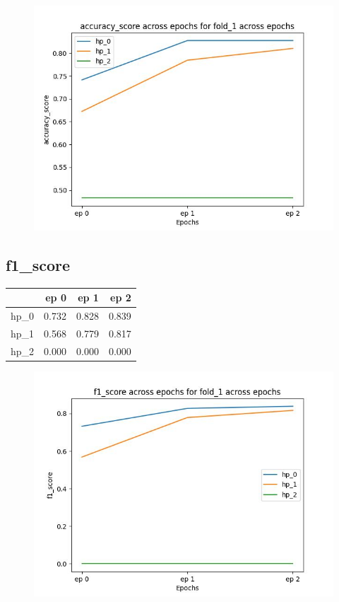 \documentclass{article}
\begin{document}
\begin{figure}[H]
\includegraphics[scale = 0.75]{fold_1/accuracy_score}
\end{figure}
\subsection{f1\_score}
\begin{tabular}{lrrr}
\toprule
{} &   ep 0 &   ep 1 &   ep 2 \\
\midrule
hp\_0 &  0.732 &  0.828 &  0.839 \\
hp\_1 &  0.568 &  0.779 &  0.817 \\
hp\_2 &  0.000 &  0.000 &  0.000 \\
\bottomrule
\end{tabular}

\begin{figure}[H]
\includegraphics[scale = 0.75]{fold_1/f1_score}
\end{figure}
\end{document}
